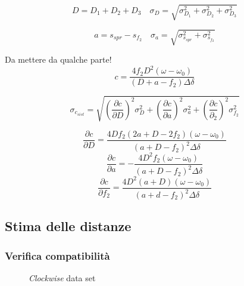 \documentclass[a4paper,11pt]{article}
\begin{document}
	
	\begin{equation}\label{eqn:D}
	D = D_1 + D_2 + D_3 \quad \sigma_D = \sqrt{\sigma_{D_1}^2 + \sigma_{D_2}^2 + \sigma_{D_3}^2}
	\end{equation}
	
	\begin{equation}\label{eqn:a}
	a = s_{spr} - s_{f_2} \quad \sigma_a = \sqrt{ \sigma_{s_{spr}}^2+\sigma_{s_{f_2}}^2}
	\end{equation}
	
	Da mettere da qualche parte!
	\begin{equation}\label{eqn:c}
	c = \dfrac{4 f_2 D^2 \left(\omega - \omega_0 \right)}{\left(D + a - f_2\right)\Delta\delta}
	\end{equation}
	
	\begin{equation}\label{eqn:sigmac}
		\sigma_{c_{sist}} = \sqrt{\left(\frac{\partial c}{\partial D}\right)^2\sigma_D^2+
			\left(\frac{\partial c}{\partial a}\right)^2\sigma_a^2+\left(\frac{\partial c}{\partial _2}\right)^2\sigma_{f_2}^2}
	\end{equation}
	
	\begin{equation}\label{eqn:cderivD}
	\frac{\partial c}{\partial D}=\dfrac{4Df_2(2a+D-2f_2)(\omega-\omega_0)}{(a+D-f_2)^2\Delta\delta}
	\end{equation}
	\begin{equation}\label{eqn:deriva}
	\frac{\partial c}{\partial a} = - \dfrac{4D^2f_2(\omega-\omega_0)}{\left(a+D-f_2\right)^2\Delta\delta}
	\end{equation}
	\begin{equation}\label{eqn:derivf2}
	\frac{\partial c}{\partial f_2}=\frac{4D^2(a+D)(\omega-\omega_0)}{(a+d-f_2)^2\Delta\delta}
	\end{equation}

	\subsection{Stima delle distanze}\label{sec:dist}
	\subsubsection{Verifica compatibilità} \label{subsubsec:vercomp}
	\begin{figure}
		\centering
		\caption{\emph{Clockwise} data set}
		\label{fig:clockwiseplot}
	\end{figure}
	
\end{document}
